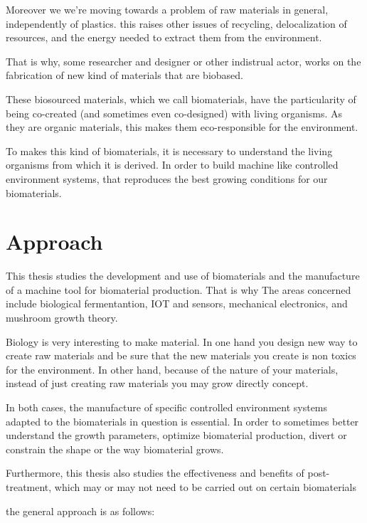 Moreover we we're moving towards a problem of raw materials in general, independently of plastics. this raises other issues of recycling, delocalization of resources, and the energy needed to extract them from the environment.

That is why, some researcher and designer or other indistrual actor, works on the fabrication of new kind of materials that are biobased.
 
These biosourced materials, which we call biomaterials, have the particularity of being co-created (and sometimes even co-designed) with living organisms. As they are organic materials, this makes them eco-responsible for the environment. 

To makes this kind of biomaterials, it is necessary to understand the living organisms from which it is derived. In order to build machine like controlled environment systems, that reproduces the best growing conditions for our biomaterials.

\section{Approach}
This thesis studies the development and use of biomaterials and the manufacture of a machine tool for biomaterial production.
That is why The areas concerned include biological fermentantion, IOT and sensors, mechanical electronics, and mushroom growth theory. 

Biology is very interesting to make material. In one hand you design new way to create raw materials and be sure that the new materials you create is non toxics for the environment. In other hand, because of the nature of your materials, instead of just creating raw materials you may grow directly concept. 

In both cases, the manufacture of specific controlled environment systems adapted to the biomaterials in question is essential. 
In order to sometimes better understand the growth parameters, optimize biomaterial production, divert or constrain the shape or the way biomaterial grows. 

Furthermore, this thesis also studies the effectiveness and benefits of post-treatment, which may or may not need to be carried out on certain biomaterials 

the general approach is as follows: 


